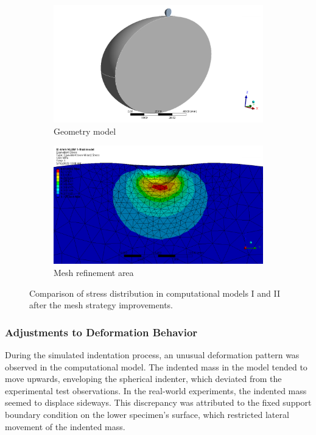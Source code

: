 \begin{figure}
    \centering
    \begin{subfigure}[b]{0.7\textwidth}
    \centering
    \includegraphics[width=\textwidth]{Images/computational/cm2geometry.png}
    \caption{Geometry model}
    \label{fig:cm1stress}
    \end{subfigure}
    \hspace{0.3cm}
    \begin{subfigure}[b]{0.7\textwidth}
    \centering
    \includegraphics[width=\textwidth]{Images/computational/stresscmII.png}
    \caption{Mesh refinement area}
    \label{fig:cm2stress}
    \end{subfigure}
    \hspace{0.3cm}
    \caption[Stress distribution analysis]{Comparison of stress distribution in computational models I and II after the mesh strategy improvements.}
    \label{fig:cmIIstressdistanalysis}
\end{figure}

\subsubsection*{Adjustments to Deformation Behavior}
During the simulated indentation process, an unusual deformation pattern was observed in the computational model.
The indented mass in the model tended to move upwards, enveloping the spherical indenter, which deviated from the 
experimental test observations. In the real-world experiments, the indented mass seemed to 
displace sideways. This discrepancy was attributed to the fixed support boundary condition on the lower specimen's 
surface, which restricted lateral movement of the indented mass.

